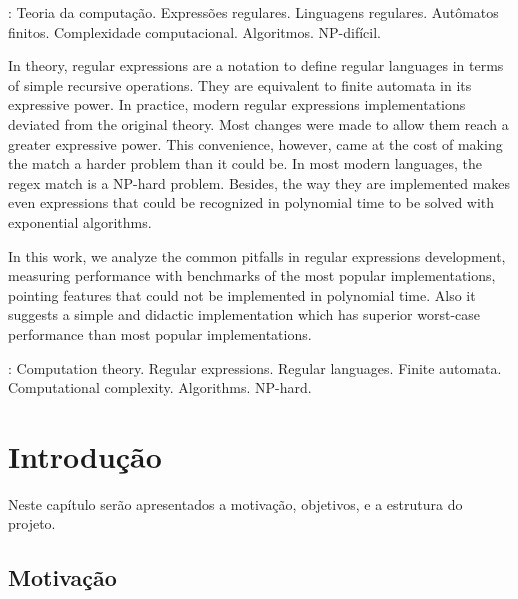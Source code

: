 \documentclass[a4paper,12pt,oneside,onecolumn]{uerj}
\begin{document}
: Teoria da computação. Expressões regulares. Linguagens regulares. Autômatos finitos. Complexidade computacional. Algoritmos. NP-difícil.



In theory, regular expressions are a notation to define regular languages in terms of simple recursive operations. They are equivalent to finite automata in its expressive power. In practice, modern regular expressions implementations deviated from the original theory. Most changes were made to allow them reach a greater expressive power. This convenience, however, came at the cost of making the match a harder problem than it could be. In most modern languages, the regex match is a NP-hard problem. Besides, the way they are implemented makes even expressions that could be recognized in polynomial time to be solved with exponential algorithms.

In this work, we analyze the common pitfalls in regular expressions development, measuring performance with benchmarks of the most popular implementations, pointing features that could not be implemented in polynomial time. Also it suggests a simple and didactic implementation which has superior worst-case performance than most popular implementations.

: Computation theory. Regular expressions. Regular languages. Finite automata. Computational complexity. Algorithms. NP-hard.

\listadefiguras
\lstlistoflistings

\sumario

\mainmatter

\chapter{Introdução}

Neste capítulo serão apresentados a motivação, objetivos, e a estrutura do projeto.

\section{Motivação}
\end{document}

